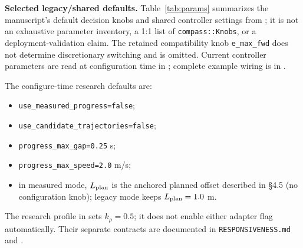 \documentclass[11pt]{article}
\newcommand{\code}[1]{\texttt{#1}}
\begin{document}
\textbf{Selected legacy/shared defaults.} Table~\ref{tab:params} summarizes the manuscript's default decision knobs and shared controller settings from ; it is not an exhaustive parameter inventory, a 1:1 list of \code{compass::Knobs}, or a deployment-validation claim. The retained compatibility knob \code{e\_max\_fwd} does not determine discretionary switching and is omitted. Current controller parameters are read at configuration time in ; complete example wiring is in .

The configure-time research defaults are:
\begin{itemize}
\setlength{\itemsep}{0pt}
\setlength{\parsep}{0pt}
\item \code{use\_measured\_progress=false};
\item \code{use\_candidate\_trajectories=false};
\item \code{progress\_max\_gap=0.25} s;
\item \code{progress\_max\_speed=2.0} m/s;
\item in measured mode, $L_{\rm plan}$ is the anchored planned offset described in \S4.5 (no configuration knob); legacy mode keeps $L_{\rm plan}=1.0$ m.
\end{itemize}

The research profile in  sets $k_\rho=0.5$; it does not enable either adapter flag automatically. Their separate contracts are documented in \code{RESPONSIVENESS.md} and .
\end{document}
